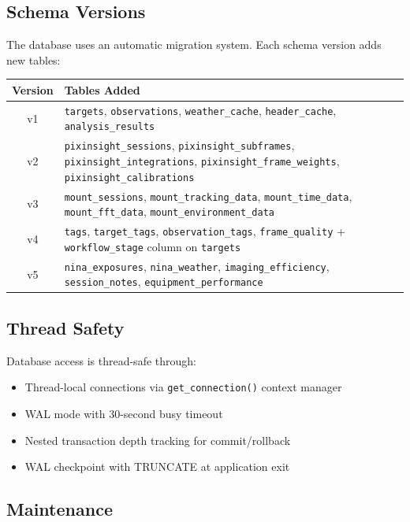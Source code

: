 \documentclass[11pt,a4paper]{article}
\begin{document}
\subsection{Schema Versions}

The database uses an automatic migration system. Each schema version adds new tables:

\begin{center}
\begin{tabular}{cp{10cm}}
\toprule
\textbf{Version} & \textbf{Tables Added} \\
\midrule
v1 & \texttt{targets}, \texttt{observations}, \texttt{weather\_cache}, \texttt{header\_cache}, \texttt{analysis\_results} \\
v2 & \texttt{pixinsight\_sessions}, \texttt{pixinsight\_subframes}, \texttt{pixinsight\_integrations}, \texttt{pixinsight\_frame\_weights}, \texttt{pixinsight\_calibrations} \\
v3 & \texttt{mount\_sessions}, \texttt{mount\_tracking\_data}, \texttt{mount\_time\_data}, \texttt{mount\_fft\_data}, \texttt{mount\_environment\_data} \\
v4 & \texttt{tags}, \texttt{target\_tags}, \texttt{observation\_tags}, \texttt{frame\_quality} + \texttt{workflow\_stage} column on \texttt{targets} \\
v5 & \texttt{nina\_exposures}, \texttt{nina\_weather}, \texttt{imaging\_efficiency}, \texttt{session\_notes}, \texttt{equipment\_performance} \\
\bottomrule
\end{tabular}
\end{center}

\subsection{Thread Safety}

Database access is thread-safe through:
\begin{itemize}
    \item Thread-local connections via \texttt{get\_connection()} context manager
    \item WAL mode with 30-second busy timeout
    \item Nested transaction depth tracking for commit/rollback
    \item WAL checkpoint with TRUNCATE at application exit
\end{itemize}

\subsection{Maintenance}
\end{document}
